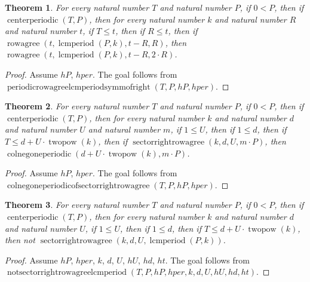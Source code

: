 \documentclass[11pt]{article}
\newtheorem{theorem}{Theorem}[section]
\theoremstyle{definition}
\begin{document}
\begin{theorem}
\label{ll:paper:periodic-rowagree-lcmperiod-symm-of-right}
For every natural number \(T\) and natural number \(P\), if \(0 < P\), then if \(\operatorname{centerperiodic}(T, P)\), then for every natural number \(k\) and natural number \(R\) and natural number \(t\), if \(T \le t\), then if \(R \le t\), then if \(\operatorname{rowagree}(t, \operatorname{lcmperiod}(P, k), t - R, R)\), then \(\operatorname{rowagree}(t, \operatorname{lcmperiod}(P, k), t - R, 2 \cdot R)\).
\end{theorem}
\begin{proof}
Assume \(hP\), \(hper\).
The goal follows from \(\operatorname{periodicrowagreelcmperiodsymmofright}(T, P, hP, hper)\).
\end{proof}
\begin{theorem}
\label{ll:paper:colnegoneperiodic-of-sector-right-rowagree}
For every natural number \(T\) and natural number \(P\), if \(0 < P\), then if \(\operatorname{centerperiodic}(T, P)\), then for every natural number \(k\) and natural number \(d\) and natural number \(U\) and natural number \(m\), if \(1 \le U\), then if \(1 \le d\), then if \(T \le d + U \cdot \operatorname{twopow}(k)\), then if \(\operatorname{sectorrightrowagree}(k, d, U, m \cdot P)\), then \(\operatorname{colnegoneperiodic}(d + U \cdot \operatorname{twopow}(k), m \cdot P)\).
\end{theorem}
\begin{proof}
Assume \(hP\), \(hper\).
The goal follows from \(\operatorname{colnegoneperiodicofsectorrightrowagree}(T, P, hP, hper)\).
\end{proof}
\begin{theorem}
\label{ll:paper:not-sector-right-rowagree-lcmperiod}
For every natural number \(T\) and natural number \(P\), if \(0 < P\), then if \(\operatorname{centerperiodic}(T, P)\), then for every natural number \(k\) and natural number \(d\) and natural number \(U\), if \(1 \le U\), then if \(1 \le d\), then if \(T \le d + U \cdot \operatorname{twopow}(k)\), then not \(\operatorname{sectorrightrowagree}(k, d, U, \operatorname{lcmperiod}(P, k))\).
\end{theorem}
\begin{proof}
Assume \(hP\), \(hper\), \(k\), \(d\), \(U\), \(hU\), \(hd\), \(ht\).
The goal follows from \(\operatorname{notsectorrightrowagreelcmperiod}(T, P, hP, hper, k, d, U, hU, hd, ht)\).
\end{proof}
\end{document}
